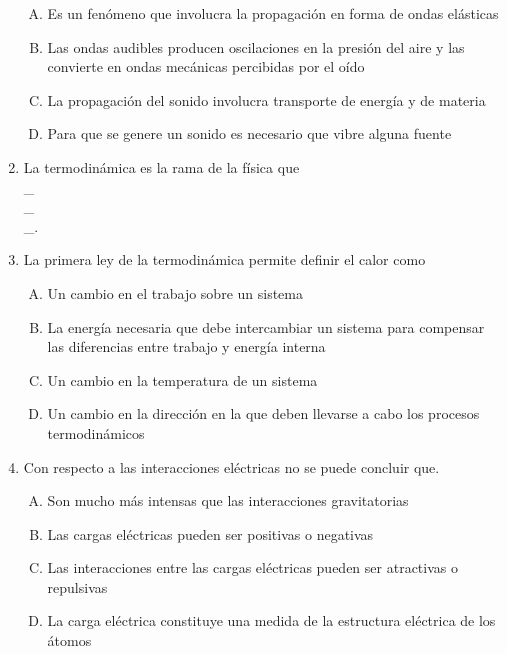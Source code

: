 \begin{enumerate}
\begin{enumerate}[(A)]
\item  Es un fenómeno que involucra la propagación en forma de ondas elásticas
\item  Las ondas audibles producen oscilaciones en la presión del aire y las convierte en ondas mecánicas percibidas por el oído
\item  La propagación del sonido involucra transporte de energía y de materia
\item  Para que se genere un sonido es necesario que vibre alguna fuente
\end{enumerate}

\item  La termodinámica es la rama de la física que \label{yolf-20}\hrulefill\\
\_\hrulefill\\
\_\hrulefill\\
\_\hrulefill.


\item   La primera ley de la termodinámica permite definir el calor como \label{yolf-21}\\

\begin{enumerate}[(A)]
\item  Un cambio en el trabajo sobre un sistema
\item  La energía necesaria que debe intercambiar un sistema para compensar las diferencias entre trabajo y energía interna
\item  Un cambio en la temperatura de un sistema
\item  Un cambio en la dirección en la que deben llevarse a cabo los procesos termodinámicos
\end{enumerate}
\item  Con respecto a las interacciones eléctricas no se puede concluir que. \label{yolf-22}\\

\begin{enumerate}[(A)]
\item  Son mucho más intensas que las interacciones gravitatorias
\item  Las cargas eléctricas pueden ser positivas o negativas
\item  Las interacciones entre las cargas eléctricas pueden ser atractivas o repulsivas
\item  La carga eléctrica constituye una medida de la estructura eléctrica de los átomos
\end{enumerate}


\end{enumerate}

